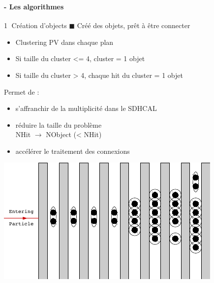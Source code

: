 \documentclass[8pt]{beamer}
\begin{document}
  
  \begin{frame}
  \frametitle{\secname}
  \framesubtitle{\subsecname - Les algorithmes}
    \begin{minipage}{0.48\linewidth}
      \begin{block}{\textcircled{{\small 1}} Création d'objects}
        $\blacksquare$ Créé des objets, prêt à être connecter
        \begin{itemize}
          \item Clustering PV dans chaque plan
          \item Si taille du cluster <= 4, cluster = 1 objet
          \item Si taille du cluster > 4, chaque hit du cluster = 1 objet 
        \end{itemize}
        Permet de :
        \begin{itemize}
          \item s'affranchir de la multiplicité dans le SDHCAL
          \item réduire la taille du problème \\ NHit $\rightarrow$ NObject (< NHit)
          \item accélérer le traitement des connexions
        \end{itemize}
      \end{block}
    \end{minipage} \hfill
    \begin{minipage}{0.48\linewidth}
      \includegraphics[width=0.9\linewidth]{ObjectCreationAfter.pdf} \\
    \end{minipage}
  \end{frame}
  
\end{document}

